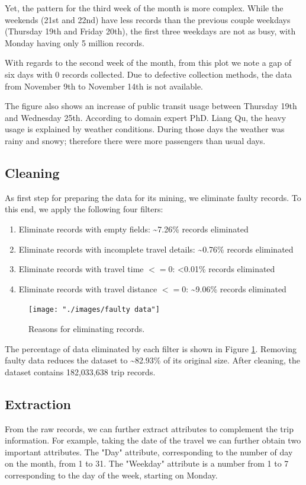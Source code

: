 \documentclass{article}
\begin{document}
Yet, the pattern for the third week of the month is more complex. While the weekends (21st and 22nd) have less records than the previous couple weekdays (Thursday 19th and Friday 20th), the first three weekdays are not as busy, with Monday having only 5 million records.

With regards to the second week of the month, from this plot we note a gap of six days with 0 records collected. Due to defective collection methods, the data from November 9th to November 14th is not available. 

The figure also shows an increase of public transit usage between Thursday 19th and Wednesday 25th. According to domain expert PhD. Liang Qu, the heavy usage is explained by weather conditions. During those days the weather was rainy and snowy; therefore there were more passengers than usual days.

\subsection{Cleaning}
As first step for preparing the data for its mining, we eliminate faulty records. To this end, we apply the following four filters:

\begin{enumerate}
\item Eliminate records with empty fields: \textasciitilde 7.26\% records eliminated
\item Eliminate records with incomplete travel details: \textasciitilde 0.76\% records eliminated
\item Eliminate records with travel time $<= 0$: <0.01\% records eliminated
\item Eliminate records with travel distance $<= 0$: \textasciitilde 9.06\% records eliminated
\end{enumerate}

\begin{figure}[h]
  \centering
  \texttt{[image: "./images/faulty data"]} %
  \caption{Reasons for eliminating records.}
  \label{fig:preprocessing/faulty}
\end{figure}

The percentage of data eliminated by each filter is shown in Figure \ref{fig:preprocessing/faulty}. Removing faulty data reduces the dataset to \textasciitilde 82.93\% of its original size. After cleaning, the dataset contains 182,033,638 trip records.  %

\subsection{Extraction}
From the raw records, we can further extract attributes to complement the trip information. For example, taking the date of the travel we can further obtain two important attributes. The "Day" attribute, corresponding to the number of day on the month, from 1 to 31. The "Weekday" attribute is a number from 1 to 7 corresponding to the day of the week, starting on Monday.
\end{document}
